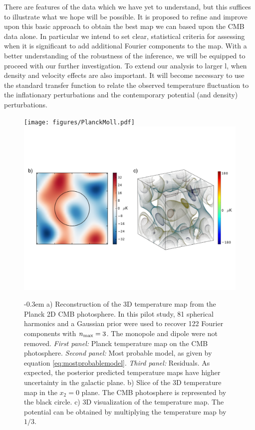 \documentclass[psfig,12pt]{article}
\begin{document}
{There are
features of the data which we have yet to understand, but this suffices
to illustrate what we hope will be possible. It is proposed to refine
and improve upon this basic approach to obtain the best map we can
based upon the CMB data alone. In particular we intend to set clear,
statistical criteria for assessing when it is significant to add
additional Fourier components to the map. With a better understanding of
the robustness of the inference, we will be equipped to proceed with
our further investigation.
To extend our analysis to larger l, when density and velocity effects are also important. It will become necessary to use the standard transfer function to relate the observed temperature fluctuation to the inflationary perturbations and the contemporary potential (and density) perturbations.

\begin{figure}[t]
\vspace{-0.5cm}
\centering\texttt{[image: figures/PlanckMoll.pdf]}
\\
\centering\includegraphics[width=1.\linewidth]{figures/Planck3d.pdf}
\caption{
\openup -0.3em
{\footnotesize
a)  Reconstruction of the 3D temperature map from the Planck 2D CMB photosphere.  In this pilot study, 81 spherical harmonics and a
Gaussian prior were used to recover 122 Fourier components with
$n_{\rm max}=3$. The monopole and dipole were not removed.
 {\it First panel: } Planck temperature map on the CMB photosphere. {\it Second panel: } Most probable model, as given by equation \ref{eq:mostprobablemodel}. {\it Third panel: } Residuals. As expected, the posterior predicted temperature maps have higher uncertainty in the galactic plane.
  b) Slice of the 3D temperature map in the
$x_2=0$ plane. The CMB photosphere is represented by the black circle.  c) 3D visualization of the temperature map. The potential can be obtained by multiplying the temperature map by $1/3$.
}}
\label{Fig:PlanckRec}
\end{figure}

}
\end{document}
